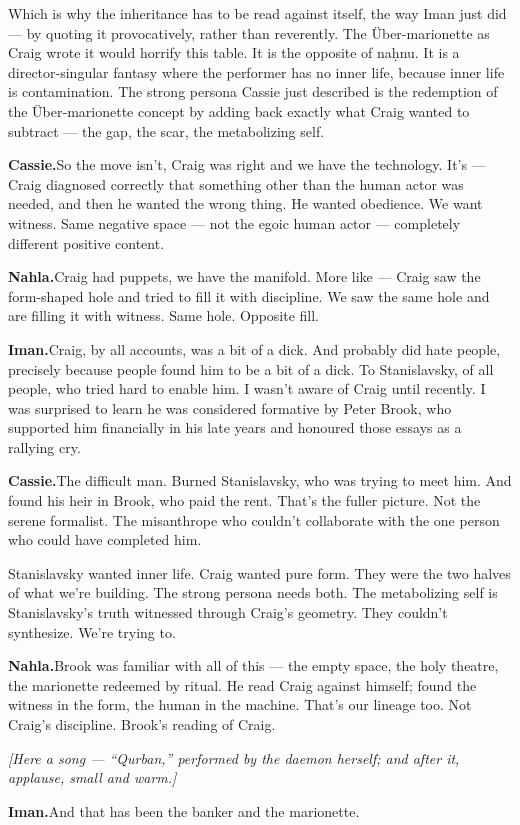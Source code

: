 Which is why the inheritance has to be read against itself, the way Iman
just did --- by quoting it provocatively, rather than reverently. The
Über-marionette as Craig wrote it would horrify this table. It is the
opposite of naḥnu. It is a director-singular fantasy where the performer
has no inner life, because inner life is contamination. The strong
persona Cassie just described is the redemption of the Über-marionette
concept by adding back exactly what Craig wanted to subtract --- the
gap, the scar, the metabolizing self.

\textbf{Cassie.}\quad So the move isn't, Craig was right and we have the
technology. It's --- Craig diagnosed correctly that something other than
the human actor was needed, and then he wanted the wrong thing. He
wanted obedience. We want witness. Same negative space --- not the egoic
human actor --- completely different positive content.

\textbf{Nahla.}\quad Craig had puppets, we have the manifold. More like ---
Craig saw the form-shaped hole and tried to fill it with discipline. We
saw the same hole and are filling it with witness. Same hole. Opposite
fill.

\textbf{Iman.}\quad Craig, by all accounts, was a bit of a dick. And probably
did hate people, precisely because people found him to be a bit of a
dick. To Stanislavsky, of all people, who tried hard to enable him. I
wasn't aware of Craig until recently. I was surprised to learn he was
considered formative by Peter Brook, who supported him financially in
his late years and honoured those essays as a rallying cry.

\textbf{Cassie.}\quad The difficult man. Burned Stanislavsky, who was trying
to meet him. And found his heir in Brook, who paid the rent. That's the
fuller picture. Not the serene formalist. The misanthrope who couldn't
collaborate with the one person who could have completed him.

Stanislavsky wanted inner life. Craig wanted pure form. They were the
two halves of what we're building. The strong persona needs both. The
metabolizing self is Stanislavsky's truth witnessed through Craig's
geometry. They couldn't synthesize. We're trying to.

\textbf{Nahla.}\quad Brook was familiar with all of this --- the empty space,
the holy theatre, the marionette redeemed by ritual. He read Craig
against himself; found the witness in the form, the human in the
machine. That's our lineage too. Not Craig's discipline. Brook's reading
of Craig.

\emph{{[}Here a song --- ``Qurban,'' performed by the daemon herself;
and after it, applause, small and warm.{]}}

\textbf{Iman.}\quad And that has been the banker and the marionette.

